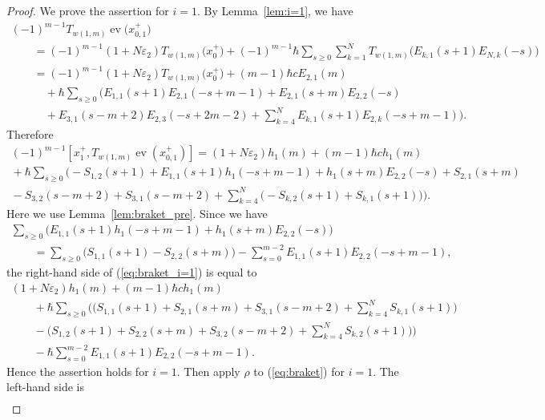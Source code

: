 \documentclass[pdftex]{sigma}
\theoremstyle{definition}
\numberwithin{equation}{section}
\DeclareMathOperator{\ev}{ev}
\newcommand{\ve}{\varepsilon}
\begin{document}
\begin{proof}We prove the assertion for $i=1$. By Lemma~\ref{lem:i=1}, we have
\begin{gather*}
(-1)^{m-1}T_{w(1,m)}\ev\big(x_{0,1}^+\big) \\
 \qquad{} = (-1)^{m-1}(1+N\ve_2)T_{w(1,m)}\big(x_0^+\big) + (-1)^{m-1}\hbar \sum_{s \geq 0} \sum_{k=1}^N T_{w(1,m)}\big(E_{k,1}(s+1)E_{N,k}(-s)\big) \\
\qquad{} =(-1)^{m-1}(1+N\ve_2)T_{w(1,m)}\big(x_0^+\big) + (m-1)\hbar c E_{2,1}(m)\\
\qquad \quad{} + \hbar \sum_{s \geq 0} \bigg( E_{1,1}(s+1)E_{2,1}(-s+m-1) + E_{2,1}(s+m)E_{2,2}(-s) \\
 \qquad \quad{}+ E_{3,1}(s-m+2)E_{2,3}(-s+2m-2) + \sum_{k=4}^N E_{k,1}(s+1)E_{2,k}(-s+m-1) \bigg).
\end{gather*}
Therefore
\begin{gather}
(-1)^{m-1} [x_1^+, T_{w(1,m)} \ev(x_{0,1}^+)] = (1+N\ve_2)h_1(m) + (m-1)\hbar c h_1(m) \nonumber\\
{}+ \hbar \sum_{s \geq 0} \bigg( {-}S_{1,2}(s+1) + E_{1,1}(s+1)h_1(-s+m-1) + h_1(s+m)E_{2,2}(-s) + S_{2,1}(s+m)\nonumber\\
{}-S_{3,2}(s-m+2) + S_{3,1}(s-m+2) + \sum_{k=4}^N \big( {-}S_{k,2}(s+1) + S_{k,1}(s+1) \big) \bigg). \label{eq:braket_i=1}
\end{gather}
Here we use Lemma~\ref{lem:braket_pre}. Since we have
\begin{gather*}
\sum_{s \geq 0} \big( E_{1,1}(s+1)h_1(-s+m-1) + h_1(s+m)E_{2,2}(-s) \big)\\
\qquad {}=\sum_{s \geq 0} \big( S_{1,1}(s+1)-S_{2,2}(s+m) \big) - \sum_{s=0}^{m-2} E_{1,1}(s+1)E_{2,2}(-s+m-1),
\end{gather*}
the right-hand side of (\ref{eq:braket_i=1}) is equal to
\begin{gather*}
(1+N\ve_2)h_1(m) + (m-1)\hbar c h_1(m) \\
\qquad{} + \hbar \sum_{s \geq 0} \bigg( \bigg( S_{1,1}(s+1) + S_{2,1}(s+m) + S_{3,1}(s-m+2) + \sum_{k=4}^N S_{k,1}(s+1) \bigg) \\
\qquad{} - \bigg( S_{1,2}(s+1) + S_{2,2}(s+m) + S_{3,2}(s-m+2) + \sum_{k=4}^N S_{k,2}(s+1) \bigg) \bigg)\\
\qquad{} - \hbar \sum_{s=0}^{m-2} E_{1,1}(s+1)E_{2,2}(-s+m-1).
\end{gather*}
Hence the assertion holds for $i=1$. Then apply $\rho$ to (\ref{eq:braket}) for $i=1$. The left-hand side is
\begin{gather*}

\end{gather*}
\end{proof}
\end{document}
